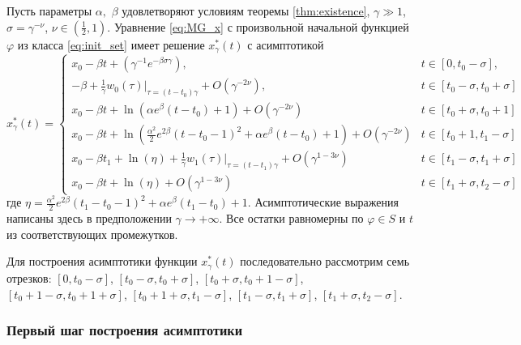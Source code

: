 \begin{theorem}
\label{thm:th_asymp}
Пусть параметры $\alpha,$ $\beta$ удовлетворяют условиям теоремы \ref{thm:existence}, $\gamma \gg 1$, $\sigma = \gamma^{-\nu}$, $\nu \in (\frac{1}{2}, 1)$. Уравнение \eqref{eq:MG_x} с произвольной начальной функцией $\varphi$ из класса \eqref{eq:init_set} имеет решение $x_\gamma^*(t)$ с асимптотикой
\small
\begin{equation}
	\label{eq:sol_x*gamma}
	x^*_\gamma(t)= 
	\begin{cases}
		x_0 - \beta t + (\gamma^{-1} e^{-\beta \sigma \gamma}), & t\in[0, t_0 - \sigma],\\
		-\beta + \frac{1}{\gamma} w_0(\tau)|_{\tau=(t-t_0)\gamma} + O(\gamma^{-2\nu}), & t \in [t_0-\sigma,t_0+\sigma]\\
		x_0 - \beta t + \ln(\alpha e^{\beta}(t - t_0)+1) + O(\gamma^{-2\nu}) & t\in[t_0 + \sigma, t_0 + 1]\\
		x_0 - \beta t + \ln(\frac{\alpha^2}{2}e^{2 \beta}(t - t_0 - 1)^2 + \alpha e^{\beta}(t - t_0) + 1) + O(\gamma^{-2\nu}) & t \in [t_0 + 1, t_1 - \sigma]\\
		x_0 - \beta t_1 + \ln(\eta)+\frac{1}{\gamma} w_1(\tau)|_{\tau=(t - t_1)\gamma} + O(\gamma^{1 - 3\nu}) & t\in[t_1 - \sigma, t_1  +\sigma]\\
		x_0 - \beta t + \ln(\eta) + O(\gamma^{1-3\nu}) & t \in [t_1+\sigma, t_2-\sigma]
	\end{cases}
\end{equation}
\normalsize
где $\eta=\frac{\alpha^2}{2}e^{2\beta}(t_1 - t_0 - 1)^2 + \alpha e^{\beta}(t_1 - t_0) + 1$.
Асимптотические выражения написаны здесь в предположении $\gamma\to+\infty$.
Все остатки равномерны по $\varphi \in S$ и $t$ из соответствующих промежутков.
\end{theorem}

Для построения асимптотики функции $x_\gamma^*(t)$ последовательно рассмотрим семь отрезков:
$[0, t_0 - \sigma]$, 
$[t_0  -\sigma, t_0 + \sigma]$,
$[t_0 + \sigma, t_0 + 1 - \sigma]$,
$[t_0 + 1 - \sigma, t_0 + 1 + \sigma]$,
$[t_0 + 1 + \sigma, t_1 - \sigma]$,
$[t_1 - \sigma, t_1 + \sigma]$,
$[t_1 + \sigma, t_2 - \sigma]$.

\subsubsection{Первый шаг построения асимптотики}

